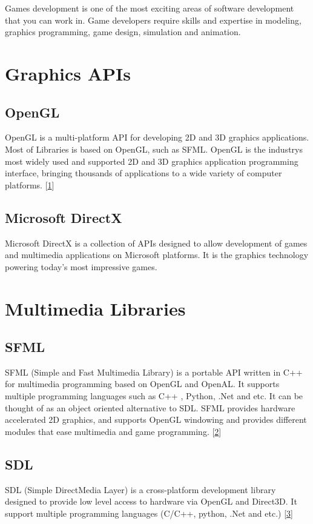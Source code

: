 Games development is one of the most exciting areas of software development that you can work in. Game developers require skills and expertise in modeling, graphics programming, game design, simulation and animation.\hypertarget{_game_development_GameDevelopmentGraphicsAPIs}{}\section{Graphics A\+P\+Is}\label{_game_development_GameDevelopmentGraphicsAPIs}
\hypertarget{_game_development_GameDevelopmentGraphicsAPIsOpenGL}{}\subsection{Open\+G\+L}\label{_game_development_GameDevelopmentGraphicsAPIsOpenGL}
Open\+G\+L is a multi-\/platform A\+P\+I for developing 2\+D and 3\+D graphics applications. Most of Libraries is based on Open\+G\+L, such as S\+F\+M\+L. Open\+G\+L is the industry\textquotesingle{}s most widely used and supported 2\+D and 3\+D graphics application programming interface, bringing thousands of applications to a wide variety of computer platforms. \mbox{[}\hyperlink{_reference_r1}{1}\mbox{]} \hypertarget{_game_development_GameDevelopmentGraphicsAPIsMicrosoftDirectX}{}\subsection{Microsoft Direct\+X}\label{_game_development_GameDevelopmentGraphicsAPIsMicrosoftDirectX}
Microsoft Direct\+X is a collection of A\+P\+Is designed to allow development of games and multimedia applications on Microsoft platforms. It is the graphics technology powering today’s most impressive games.\hypertarget{_game_development_GameDevelopmentMultimediaLibraries}{}\section{Multimedia Libraries}\label{_game_development_GameDevelopmentMultimediaLibraries}
\hypertarget{_game_development_GameDevelopmentMultimediaLibrariesSFML}{}\subsection{S\+F\+M\+L}\label{_game_development_GameDevelopmentMultimediaLibrariesSFML}
S\+F\+M\+L (Simple and Fast Multimedia Library) is a portable A\+P\+I written in C++ for multimedia programming based on Open\+G\+L and Open\+A\+L. It supports multiple programming languages such as C++ , Python, .Net and etc. It can be thought of as an object oriented alternative to S\+D\+L. S\+F\+M\+L provides hardware accelerated 2\+D graphics, and supports Open\+G\+L windowing and provides different modules that ease multimedia and game programming. \mbox{[}\hyperlink{_reference_r2}{2}\mbox{]} \hypertarget{_game_development_GameDevelopmentMultimediaLibrariesSDL}{}\subsection{S\+D\+L}\label{_game_development_GameDevelopmentMultimediaLibrariesSDL}
S\+D\+L (Simple Direct\+Media Layer) is a cross-\/platform development library designed to provide low level access to hardware via Open\+G\+L and Direct3\+D. It support multiple programming languages (C/\+C++, python, .Net and etc.) \mbox{[}\hyperlink{_reference_r3}{3}\mbox{]} 